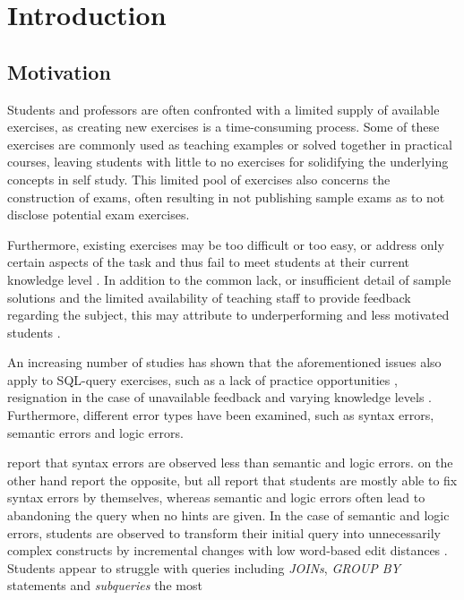 \chapter{Introduction}
\label{ch:intro}

\section{Motivation}
\label{sec:intro:motivation}

Students and professors are often confronted with a limited supply of available exercises, as creating new exercises is a time-consuming process. Some of these exercises are commonly used as teaching examples or solved together in practical courses, leaving students with little to no exercises for solidifying the underlying concepts in self study. This limited pool of exercises also concerns the construction of exams, often resulting in not publishing sample exams as to not disclose potential exam exercises. 

Furthermore, existing exercises may be too difficult or too easy, or address only certain aspects of the task and thus fail to meet students at their current knowledge level \cite{Taufik2019AnIT}. In addition to the common lack, or insufficient detail of sample solutions and the limited availability of teaching staff to provide feedback regarding the subject, this may attribute to underperforming and less motivated students \cite{Gibson2021ImprovingSE}.

An increasing number of studies has shown that the aforementioned issues also apply to SQL-query exercises, such as a lack of practice opportunities \cite{Miedema2022ExpertPO}, resignation in the case of unavailable feedback \cite{Miedema2022SoMB} and varying knowledge levels \cite{Silva2022DBSnapEvalID, Poulsen2020InsightsFS}. Furthermore, different error types have been examined, such as syntax errors, semantic errors and logic errors. 

\cite{Taipalus2019WhatTE, Taipalus2020ExplainingCB, Poulsen2020InsightsFS} report that syntax errors are observed less than semantic and logic errors.
\cite{Silva2022DBSnapEvalID, Miedema2022SoMB, Taipalus2019WhatTE, Miedema2021IdentifyingSM} on the other hand report the opposite, but all report that students are mostly able to fix syntax errors by themselves, whereas semantic and logic errors often lead to abandoning the query when no hints are given. In the case of semantic and logic errors, students are observed to transform their initial query into unnecessarily complex constructs by incremental changes with low word-based edit distances \cite{Miedema2022SoMB}. Students appear to struggle with queries including \textit{JOINs}, \textit{GROUP BY} statements and \textit{subqueries} the most \cite{Smelcer1995UserEI, Ahadi2016StudentsSM, Ahadi2015AQS, Miedema2022IdentifyingSM}


